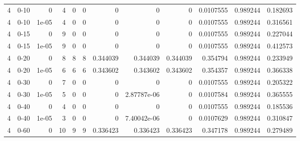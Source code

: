 \begin{tabular}{rlrrrrrrrrrr}
     4 & 0-10   &      0     &           4 &                 0 &                 0 &     0           &     0           &      0           &        0.0107555 &               0.989244 &           0.182693 \\
     4 & 0-10   &      1e-05 &           4 &                 0 &                 0 &     0           &     0           &      0           &        0.0107555 &               0.989244 &           0.316561 \\
     4 & 0-15   &      0     &           9 &                 0 &                 0 &     0           &     0           &      0           &        0.0107555 &               0.989244 &           0.227044 \\
     4 & 0-15   &      1e-05 &           9 &                 0 &                 0 &     0           &     0           &      0           &        0.0107555 &               0.989244 &           0.412573 \\
     4 & 0-20   &      0     &           8 &                 8 &                 8 &     0.344039    &     0.344039    &      0.344039    &        0.354794  &               0.989244 &           0.233949 \\
     4 & 0-20   &      1e-05 &           6 &                 6 &                 6 &     0.343602    &     0.343602    &      0.343602    &        0.354357  &               0.989244 &           0.366338 \\
     4 & 0-30   &      0     &           7 &                 0 &                 0 &     0           &     0           &      0           &        0.0107555 &               0.989244 &           0.205322 \\
     4 & 0-30   &      1e-05 &           5 &                 0 &                 0 &     0           &     2.87787e-06 &      0           &        0.0107584 &               0.989244 &           0.365555 \\
     4 & 0-40   &      0     &           4 &                 0 &                 0 &     0           &     0           &      0           &        0.0107555 &               0.989244 &           0.185536 \\
     4 & 0-40   &      1e-05 &           3 &                 0 &                 0 &     0           &     7.40042e-06 &      0           &        0.0107629 &               0.989244 &           0.310847 \\
     4 & 0-60   &      0     &          10 &                 9 &                 9 &     0.336423    &     0.336423    &      0.336423    &        0.347178  &               0.989244 &           0.279489 \\

\end{tabular}
